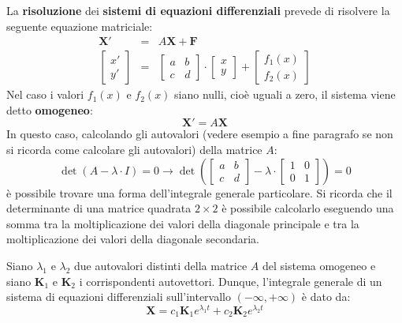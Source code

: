 \documentclass[a4paper]{article}
\newcommand{\definition}[1]{\textcolor{Red3}{\textbf{#1}}}
\begin{document}
	\noindent
	La \textbf{risoluzione} dei \definition{sistemi di equazioni differenziali} prevede di risolvere la seguente equazione matriciale:
	\begin{equation}\label{eq: sistemi di equazioni differenziali}
		\begin{array}{rcl}
			\mathbf{X}' &=& A\mathbf{X} + \mathbf{F} \\ [1em]
			\begin{bmatrix}
				x' \\ y'
			\end{bmatrix}
			&=&
			\begin{bmatrix}
				a & b \\ c & d
			\end{bmatrix}
			\cdot
			\begin{bmatrix}
				x \\ y
			\end{bmatrix}
			+
			\begin{bmatrix}
				f_{1}\left(x\right) \\
				f_{2}\left(x\right)
			\end{bmatrix}
		\end{array}
	\end{equation}
	Nel caso i valori $f_{1}\left(x\right)$ e $f_{2}\left(x\right)$ siano nulli, cioè uguali a zero, il sistema viene detto \textbf{omogeneo}:
	\begin{equation*}
		\mathbf{X}' = A \mathbf{X}
	\end{equation*}
	In questo caso, calcolando gli autovalori (vedere esempio a fine paragrafo se non si ricorda come calcolare gli autovalori) della matrice $A$: 
	\begin{equation*}
		\det\left(A - \lambda \cdot I\right) = 0 \rightarrow
		\det\left(
			\begin{bmatrix}
				a & b \\ c & d
			\end{bmatrix}
			-
			\lambda \cdot \begin{bmatrix}
				1 & 0 \\ 0 & 1
			\end{bmatrix}
		\right) = 0
	\end{equation*}
	è possibile trovare una forma dell'integrale generale particolare. Si ricorda che il determinante di una matrice quadrata $2 \times 2$ è possibile calcolarlo eseguendo una somma tra la moltiplicazione dei valori della diagonale principale e tra la moltiplicazione dei valori della diagonale secondaria.

	\begin{boxdef}
		Siano $\lambda_{1}$ e $\lambda_{2}$ due autovalori distinti della matrice $A$ del sistema omogeneo e siano $\mathbf{K}_{1}$ e $\mathbf{K}_{2}$ i corrispondenti autovettori. Dunque, l'integrale generale di un sistema di equazioni differenziali sull'intervallo $\left(-\infty, + \infty\right)$ è dato da:
		\begin{equation*}
			\mathbf{X} = c_{1} \mathbf{K}_{1} e^{\lambda_{1}t} + c_{2} \mathbf{K}_{2} e^{\lambda_{2}t}
		\end{equation*}
	\end{boxdef}\newpage
\end{document}
